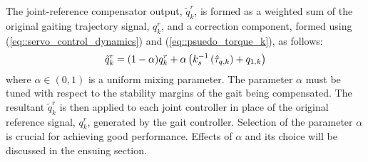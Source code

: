 The joint-reference compensator output, $\tilde{q}_{k}^{r}$, is formed as a weighted sum of the original gaiting trajectory signal, ${q}_{k}^{r}$, and a correction component, formed using (\ref{eq::servo_control_dynamics}) and (\ref{eq::psuedo_torque_k}), as follows:
	\vspace{-1mm}
	\begin{equation}
		\vspace{-1mm}
	 	\tilde{q}_{k}^{r} 	= (1-\alpha) {q}_{k}^{r} + \alpha \left( k_{s}^{-1}  \left(  \hat{\tau}_{q,k}  \right) +  {q}_{1,k} \right)
		\label{eq::correction_application}
	\end{equation}
where  $\alpha \in (0,1)$ is a uniform mixing parameter. The parameter $\alpha$ must be tuned with respect to the stability margins of the gait being compensated. The resultant $\tilde{q}_{k}^{r}$ is then applied  to each joint controller in place of the original reference signal,  ${q}_{k}^{r}$, generated by the gait controller. Selection of the parameter $\alpha$ is crucial for achieving good performance. Effects of $\alpha$ and its choice will be discussed in the ensuing section. 
